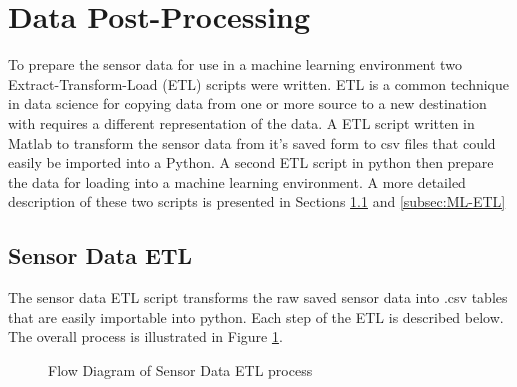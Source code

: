 





\section{Data Post-Processing}
To prepare the sensor data for use in a machine learning environment two Extract-Transform-Load (ETL) scripts were written. ETL is a common technique in data science for copying data from one or more source to a new destination with requires a different representation of the data. A ETL script written in Matlab to transform the sensor data from it's saved form to csv files that could easily be imported into a Python. A second ETL script in python then prepare the data for loading into a machine learning environment. A more detailed description of these two scripts is presented in Sections \ref{subsec:sensor-ETL} and \ref{subsec:ML-ETL}

\subsection{Sensor Data ETL}
\label{subsec:sensor-ETL}
The sensor data ETL script transforms the raw saved sensor data into .csv tables that are easily importable into python. Each step of the ETL is described below. The overall process is illustrated in Figure \ref{fig:methods_sensor_ETL}.

\begin{figure}[!hbt]
    \centering
    \caption{Flow Diagram of Sensor Data ETL process}
    \label{fig:methods_sensor_ETL}
\end{figure}

